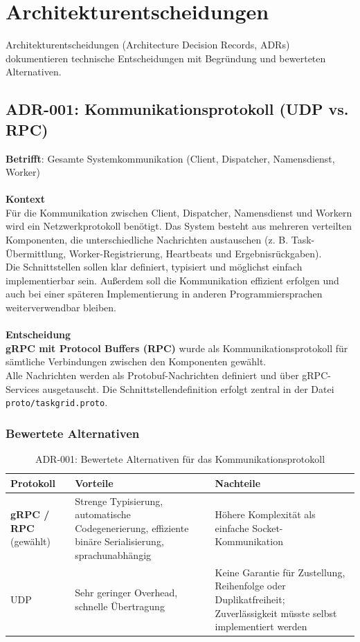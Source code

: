\section{Architekturentscheidungen}
\label{sec:adr}

Architekturentscheidungen (Architecture Decision Records, ADRs)
dokumentieren technische Entscheidungen mit Begründung und
bewerteten Alternativen.

\subsection{ADR-001: Kommunikationsprotokoll (UDP vs. RPC)}
\textbf{Betrifft}: Gesamte Systemkommunikation (Client, Dispatcher, Namensdienst, Worker)
\\\\
\noindent \textbf{Kontext}\\
\noindent Für die Kommunikation zwischen Client, Dispatcher, Namensdienst und Workern
wird ein Netzwerkprotokoll benötigt. Das System besteht aus mehreren
verteilten Komponenten, die unterschiedliche Nachrichten austauschen
(z. B. Task-Übermittlung, Worker-Registrierung, Heartbeats und Ergebnisrückgaben).
\\
Die Schnittstellen sollen klar definiert, typisiert und möglichst einfach
implementierbar sein. Außerdem soll die Kommunikation effizient erfolgen
und auch bei einer späteren Implementierung in anderen Programmiersprachen
weiterverwendbar bleiben.
\\\\
\textbf{Entscheidung}\\
\noindent \textbf{gRPC mit Protocol Buffers (RPC)} wurde als Kommunikationsprotokoll
für sämtliche Verbindungen zwischen den Komponenten gewählt.
\\
Alle Nachrichten werden als Protobuf-Nachrichten definiert und über
gRPC-Services ausgetauscht. Die Schnittstellendefinition erfolgt zentral
in der Datei \texttt{proto/taskgrid.proto}.

\subsubsection*{Bewertete Alternativen}

\begin{table}[H]
	\centering
	\begin{tabular}{m{2.5cm} m{6.75cm} m{6cm}}
		\toprule
		\textbf{Protokoll} & \textbf{Vorteile} & \textbf{Nachteile} \\
		\midrule
		\textbf{gRPC / RPC} (gewählt) &
		Strenge Typisierung, automatische Codegenerierung, effiziente binäre Serialisierung, sprachunabhängig &
		Höhere Komplexität als einfache Socket-Kommunikation \\
		\midrule
		UDP &
		Sehr geringer Overhead, schnelle Übertragung &
		Keine Garantie für Zustellung, Reihenfolge oder Duplikatfreiheit; Zuverlässigkeit müsste selbst implementiert werden \\
		\bottomrule
	\end{tabular}
	\caption{ADR-001: Bewertete Alternativen für das Kommunikationsprotokoll}
\end{table}

